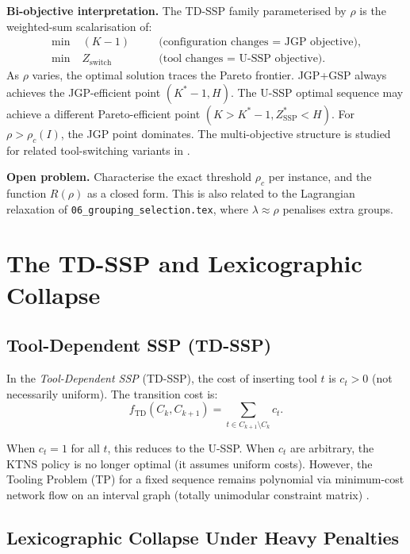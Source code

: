 \documentclass[11pt,a4paper]{article}
\theoremstyle{plain}
\theoremstyle{definition}
\newcommand{\ZSSP}{Z_{\mathrm{SSP}}^*}
\begin{document}
\medskip
\noindent\textbf{Bi-objective interpretation.}
The TD-SSP family parameterised by $\rho$ is the weighted-sum scalarisation of:
\begin{align*}
  \min\; & (K - 1) \quad &&\text{(configuration changes = JGP objective)},\\
  \min\; & Z_{\mathrm{switch}} \quad &&\text{(tool changes = U-SSP objective)}.
\end{align*}
As $\rho$ varies, the optimal solution traces the Pareto frontier.
JGP+GSP always achieves the JGP-efficient point $(K^*-1, H)$.
The U-SSP optimal sequence may achieve a different Pareto-efficient point
$(K > K^*-1, \ZSSP < H)$. For $\rho > \rho_c(I)$, the JGP point dominates.
The multi-objective structure is studied for related tool-switching variants
in \cite{Furrer2017}.

\noindent\textbf{Open problem.}
Characterise the exact threshold $\rho_c$ per instance, and the function $R(\rho)$
as a closed form. This is also related to the Lagrangian relaxation of
\texttt{06\_grouping\_selection.tex}, where $\lambda \approx \rho$ penalises extra
groups.

\section{The TD-SSP and Lexicographic Collapse}
\label{sec:td_ssp}

\subsection{Tool-Dependent SSP (TD-SSP)}

In the \emph{Tool-Dependent SSP} (TD-SSP), the cost of inserting tool $t$ is
$c_t > 0$ (not necessarily uniform). The transition cost is:
\[
  f_\mathrm{TD}(C_k, C_{k+1}) = \sum_{t \in C_{k+1} \setminus C_k} c_t.
\]

When $c_t = 1$ for all $t$, this reduces to the U-SSP. When $c_t$ are arbitrary,
the KTNS policy is no longer optimal (it assumes uniform costs). However, the
Tooling Problem (TP) for a fixed sequence remains polynomial via minimum-cost
network flow on an interval graph (totally unimodular constraint matrix)
\cite{Privault1995}.

\subsection{Lexicographic Collapse Under Heavy Penalties}
\end{document}
